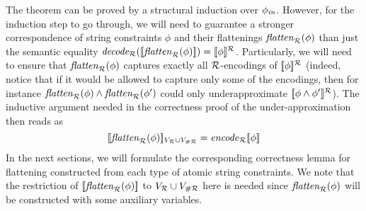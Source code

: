 \documentclass[sigplan,review,anonymous]{acmart}\settopmatter{printfolios=true,printccs=false,printacmref=false}
\begin{document}
The theorem can be proved by a structural induction over $\phi_{\mathit{in}}$.
However, for the induction step to go through, we will need to guarantee a stronger correspondence of string constraints $\phi$ and their flattenings $\mathit{flatten}_{\mathcal{R}}(\phi)$ than just the semantic equality $\mathit{decode_{\mathcal{R}}} ([\![\mathit{flatten}_{\mathcal{R}}(\phi)]\!]) = [\![\phi]\!]^{\mathcal{R}}$.  
Particularly, we will need to
 ensure that $\mathit{flatten}_{\mathcal{R}}(\phi)$ captures exactly all $\mathcal{R}$-encodings of $[\![\phi]\!]^{\mathcal{R}}$
(indeed, notice that if it would be allowed to capture only some of the encodings, then for instance $\mathit{flatten}_{\mathcal{R}}(\phi) \land \mathit{flatten}_{\mathcal{R}}(\phi')$ could only underapproximate $[\![\phi\land\phi']\!]^{\mathcal{R}}$).
%
%
%
%
The inductive argument needed in the correctness proof of the under-approximation then reads as
$$[\![\mathit{flatten}_{\mathcal{R}}(\phi)]\!]_{V_{\mathcal{R}}\cup V_{\#\mathcal{R}}}  = \mathit{encode}_{\mathcal{R}}{[\![\phi]\!]}$$ 
%
In the next sections, 
we will formulate the corresponding correctness lemma for flattening constructed from each type of atomic string constraints.
%
We note that the restriction of $[\![\mathit{flatten}_{\mathcal{R}}(\phi)]\!]$ to $V_{\mathcal{R}}\cup V_{\#\mathcal{R}}$ here is needed since $\mathit{flatten}_{\mathcal{R}}(\phi)$ will be constructed with some auxiliary variables. 
\end{document}
